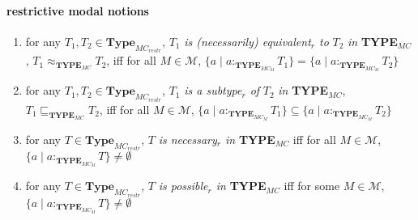 \paragraph{restrictive modal notions}  
\begin{enumerate} 
 
\item for any $T_1,T_2\in\textbf{Type}_{\mathit{MC}_{\mathit{restr}}}$, $T_1$ \textit{is
    (necessarily) equivalent$_r$
    to} $T_2$ \textit{in} {\bf TYPE$_{\mathit{MC}}$},
  $T_1\approx_{\mathbf{TYPE_{\mathit{MC}}}}T_2$,  iff for all
  $M\in\mathcal{M}$, $\{a\mid a:_{\mathbf{TYPE}_{\mathit{MC}_M}}T_1\}=\{a\mid a:_{\mathbf{TYPE}_{\mathit{MC}_M}}T_2\}$
  
 
\item for any $T_1,T_2\in\textbf{Type}_{\mathit{MC}_{\mathit{restr}}}$, $T_1$ \textit{is a subtype$_r$ of} $T_2$ \textit{in} {\bf TYPE$_{\mathit{MC}}$},
  $T_1\sqsubseteq_{\mathbf{TYPE_{\mathit{MC}}}}T_2$,  iff for all
  $M\in\mathcal{M}$, $\{a\mid a:_{\mathbf{TYPE}_{\mathit{MC}_M}}T_1\}\subseteq\{a\mid a:_{\mathbf{TYPE}_{\mathit{MC}_M}}T_2\}$

\item for any $T\in\textbf{Type}_{\mathit{MC}_{\mathit{restr}}}$, $T$ \textit{is necessary$_r$ in} {\bf TYPE$_{\mathit{MC}}$}  iff for all
  $M\in\mathcal{M}$, \\ $\{a\mid a:_{\mathbf{TYPE}_{\mathit{MC}_M}}T\}\not=\emptyset$

\item for any $T\in\textbf{Type}_{\mathit{MC}_{\mathit{restr}}}$, $T$ \textit{is possible$_r$ in} {\bf TYPE$_{\mathit{MC}}$}  iff for some
  $M\in\mathcal{M}$, \\ $\{a\mid a:_{\mathbf{TYPE}_{\mathit{MC}_M}}T\}\not=\emptyset$
 
\end{enumerate}

